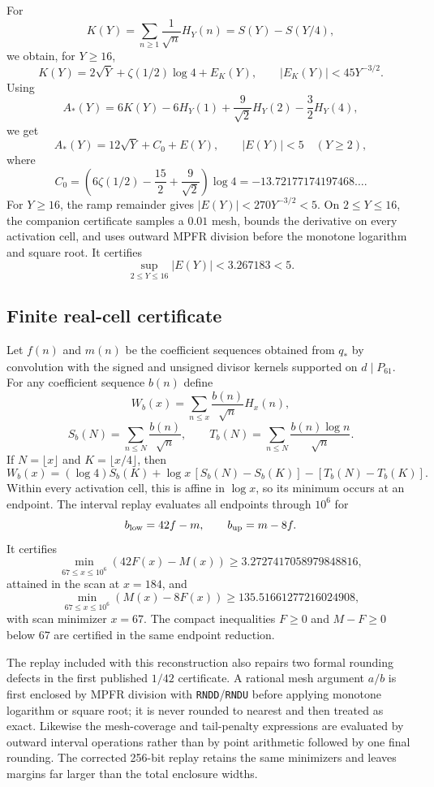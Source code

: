 \documentclass[11pt]{article}
\newcommand{\1}{\mathbf 1}
\newcommand{\Astar}{A_{\!*}}
\newcommand{\qstar}{q_{\!*}}
\begin{document}
For
\[
K(Y)=\sum_{n\ge1}\frac1{\sqrt n}H_Y(n)=S(Y)-S(Y/4),
\]
we obtain, for $Y\ge16$,
\[
K(Y)=2\sqrt Y+\zeta(1/2)\log4+E_K(Y),
\qquad |E_K(Y)|<45Y^{-3/2}.
\]
Using
\[
\Astar(Y)=6K(Y)-6H_Y(1)+\frac9{\sqrt2}H_Y(2)-\frac32H_Y(4),
\]
we get
\begin{equation}\label{eq:Aasymp}
\Astar(Y)=12\sqrt Y+C_0+E(Y),
\qquad |E(Y)|<5\quad(Y\ge2),
\end{equation}
where
\[
C_0=\left(6\zeta(1/2)-\frac{15}{2}+\frac9{\sqrt2}\right)\log4
=-13.72177174197468\ldots.
\]
For $Y\ge16$, the ramp remainder gives $|E(Y)|<270Y^{-3/2}<5$.  On $2\le Y\le16$, the companion certificate samples a $0.01$ mesh, bounds the derivative on every activation cell, and uses outward MPFR division before the monotone logarithm and square root.  It certifies
\[
\sup_{2\le Y\le16}|E(Y)|<3.267183<5.
\]

\subsection{Finite real-cell certificate}

Let $f(n)$ and $m(n)$ be the coefficient sequences obtained from $\qstar$ by convolution with the signed and unsigned divisor kernels supported on $d\mid P_{61}$.  For any coefficient sequence $b(n)$ define
\[
W_b(x)=\sum_{n\le x}\frac{b(n)}{\sqrt n}H_x(n),
\]
\[
S_b(N)=\sum_{n\le N}\frac{b(n)}{\sqrt n},
\qquad
T_b(N)=\sum_{n\le N}\frac{b(n)\log n}{\sqrt n}.
\]
If $N=\lfloor x\rfloor$ and $K=\lfloor x/4\rfloor$, then
\begin{equation}\label{eq:cell}
W_b(x)=(\log4)S_b(K)+\log x\,[S_b(N)-S_b(K)]-[T_b(N)-T_b(K)].
\end{equation}
Within every activation cell, this is affine in $\log x$, so its minimum occurs at an endpoint.  The interval replay evaluates all endpoints through $10^6$ for
\[
b_{\rm low}=42f-m,
\qquad
b_{\rm up}=m-8f.
\]
It certifies
\[
\min_{67\le x\le10^6}(42F(x)-M(x))
\ge3.2727417058979848816,
\]
attained in the scan at $x=184$, and
\[
\min_{67\le x\le10^6}(M(x)-8F(x))
\ge135.51661277216024908,
\]
with scan minimizer $x=67$.  The compact inequalities $F\ge0$ and $M-F\ge0$ below $67$ are certified in the same endpoint reduction.

The replay included with this reconstruction also repairs two formal rounding defects in the first published $1/42$ certificate.  A rational mesh argument $a/b$ is first enclosed by MPFR division with \texttt{RNDD}/\texttt{RNDU} before applying monotone logarithm or square root; it is never rounded to nearest and then treated as exact.  Likewise the mesh-coverage and tail-penalty expressions are evaluated by outward interval operations rather than by point arithmetic followed by one final rounding.  The corrected 256-bit replay retains the same minimizers and leaves margins far larger than the total enclosure widths.
\end{document}
